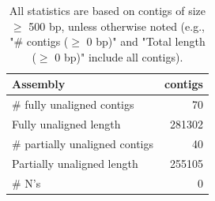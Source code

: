 \documentclass[12pt,a4paper]{article}
\begin{document}
\begin{table}[ht]
\begin{center}
\caption{All statistics are based on contigs of size $\geq$ 500 bp, unless otherwise noted (e.g., "\# contigs ($\geq$ 0 bp)" and "Total length ($\geq$ 0 bp)" include all contigs).}
\begin{tabular}{|l*{1}{|r}|}
\hline
Assembly & contigs \\ \hline
\# fully unaligned contigs & 70 \\ \hline
Fully unaligned length & 281302 \\ \hline
\# partially unaligned contigs & 40 \\ \hline
Partially unaligned length & 255105 \\ \hline
\# N's & 0 \\ \hline
\end{tabular}
\end{center}
\end{table}
\end{document}
